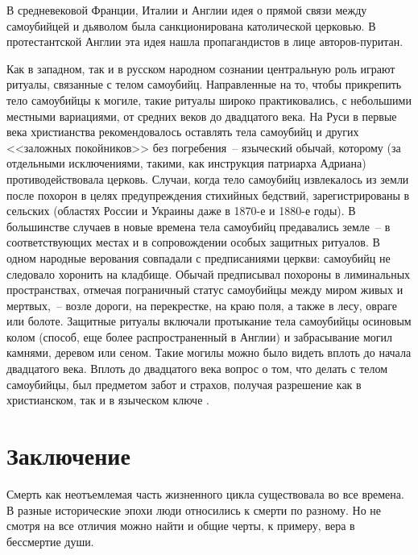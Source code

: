 \documentclass[pscyr,chapters]{hedwork}
\begin{document}
  В средневековой Франции, Италии и Англии идея о прямой связи между самоубийцей
  и дьяволом была санкционирована католической церковью. В протестантской Англии
  эта идея нашла пропагандистов в лице авторов-пуритан.

  Как в западном, так и в русском народном сознании центральную роль играют
  ритуалы, связанные с телом самоубийц. Направленные на то, чтобы прикрепить
  тело самоубийцы к могиле, такие ритуалы широко практиковались, с небольшими
  местными вариациями, от средних веков до двадцатого века. На Руси в первые
  века христианства рекомендовалось оставлять тела самоубийц и других <<заложных
  покойников>> без погребения~-- языческий обычай, которому (за отдельными
  исключениями, такими, как инструкция патриарха Адриана) противодействовала
  церковь. Случаи, когда тело самоубийц извлекалось из земли после похорон в
  целях предупреждения стихийных бедствий, зарегистрированы в сельских (областях
  России и Украины даже в 1870-е и 1880-е годы). В большинстве случаев в новые
  времена тела самоубийц предавались земле~-- в соответствующих местах и в
  сопровождении особых защитных ритуалов. В одном народные верования совпадали с
  предписаниями церкви: самоубийц не следовало хоронить на кладбище. Обычай
  предписывал похороны в лиминальных пространствах, отмечая пограничный статус
  самоубийцы между миром живых и мертвых,~-- возле дороги, на перекрестке, на
  краю поля, а также в лесу, овраге или болоте. Защитные ритуалы включали
  протыкание тела самоубийцы осиновым колом (способ, еще более распространенный
  в Англии) и забрасывание могил камнями, деревом или сеном. Такие могилы можно
  было видеть вплоть до начала двадцатого века. Вплоть до двадцатого века вопрос
  о том, что делать с телом самоубийцы, был предметом забот и страхов, получая
  разрешение как в христианском, так и в языческом ключе \cite{3}.

  \chapter*{Заключение}

  Смерть как неотъемлемая часть жизненного цикла существовала во все времена. В
  разные исторические эпохи люди относились к смерти по разному. Но не смотря на
  все отличия можно найти и общие черты, к примеру, вера в бессмертие души.
\end{document}
